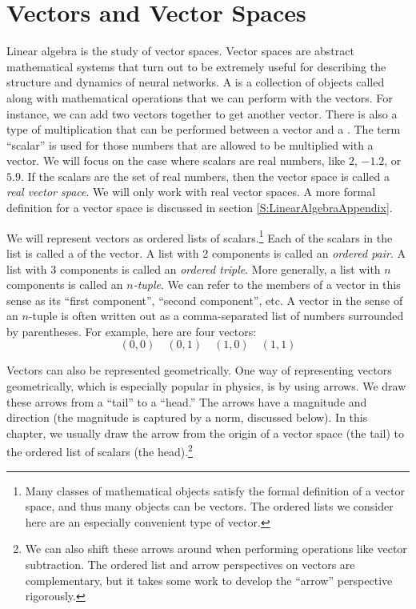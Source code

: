 
\section{Vectors and Vector Spaces}\label{sect_vector}

    Linear algebra is the study of vector spaces. Vector spaces are abstract
mathematical systems that turn out to be extremely useful for describing the 
structure and dynamics of neural networks. A  is a 
collection of objects called  along with mathematical 
operations that we can perform with the vectors. For instance, we can add two vectors together to get another vector. There is also a type of 
multiplication that can be performed between a vector and a . The term ``scalar'' is used for those numbers that are allowed to be 
multiplied with a vector. We will focus on the case where scalars are real numbers, like $2$, $-1.2$, or $5.9$. If the scalars are the set of real numbers, then the 
vector space is called a {\em real vector space}. We will only work with real
vector spaces. A more formal definition for a vector space is discussed in 
section \ref{S:LinearAlgebraAppendix}. 

We will represent vectors as ordered lists of scalars.\footnote{ Many classes of mathematical objects satisfy the formal definition of a vector space, and thus many objects can be vectors. The ordered lists we consider here are an especially convenient type of vector.} Each of the scalars in the list is called a  
of the vector. A list with 2 components is called an {\em ordered pair}. A 
list with 3 components is called an {\em ordered triple}. More generally, a
list with $n$ components is called an {\em $n$-tuple}. We can refer to the
members of a vector in this sense  as its ``first component'',  ``second component'', etc.
A vector in the sense of an $n$-tuple is often 
written out as a comma-separated list of numbers surrounded by parentheses.
For example, here are four vectors:
\begin{equation*}
    (0,0) \quad (0,1) \quad (1,0) \quad (1,1) 
\end{equation*}

Vectors can also be represented geometrically. One way of representing vectors geometrically, which is especially popular in physics, is by using arrows. We draw these arrows from a ``tail'' to a ``head.''  The arrows have a magnitude and direction (the magnitude is captured by a norm, discussed below). In this chapter, we usually draw the arrow from the origin of a vector space (the tail) to the ordered list of scalars (the head).\footnote{We can also shift these arrows around when performing operations like vector subtraction. The ordered list and arrow perspectives on vectors are complementary, but it takes some work to develop the ``arrow'' perspective rigorously.}\label{headTail}

